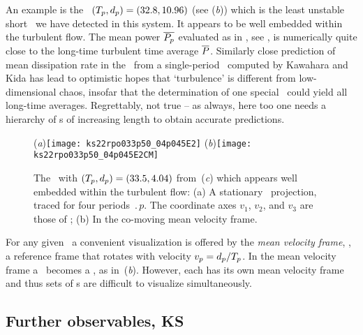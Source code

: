 An example is
the \rpo\ $({T_{p}},d_p) = (32.8,10.96)$
(see (\textit{b})) which {is the least
unstable short \rpo\ we have detected in this system. It} appears to be
well embedded within the turbulent flow. The mean power $\overline{P_p}$ evaluated
as in , see ,
is numerically quite close to the long-time
turbulent time average $\overline{P}$.
Similarly close prediction of mean dissipation rate in the
\pCf\ from a single-period \po\ computed by
Kawahara and Kida has lead to
optimistic hopes that `turbulence' is different from
low-dimensional chaos, insofar that the determination of one special
\po\ could yield all long-time averages.
Regrettably, not true -- as always, here too one needs a hierarchy
of \po s of increasing length to obtain accurate
predictions.

\begin{figure}[t]
\begin{center}
(\textit{a})\texttt{[image: ks22rpo033p50\_04p045E2]}
(\textit{b})\texttt{[image: ks22rpo033p50\_04p045E2CM]}
\\
\end{center}
\caption{
 The
\rpo\ with $({T_{p}},d_p) =(33.5,4.04)$
from \,(\textit{c})
which appears well embedded within the turbulent flow:
 (a) A stationary \statesp\ projection,
  traced for four periods $\period{p}$. The coordinate axes
$v_1$, $v_2$, and $v_3$ are those of ;
 (b) In the co-moving mean velocity frame.
        } \label{f:MeanVelocityFrame}
\end{figure}

For any given \rpo\ a convenient visualization is
offered by the {\em mean velocity frame}, {\ie},
a reference frame that rotates with velocity
$v_p=d_p/{T_{p}}$.
In the mean velocity frame a \rpo\ becomes
a \po, as in \,(\textit{b}).
However, each {\rpo} has its own mean velocity frame and thus
sets of \rpo s are difficult to visualize simultaneously.

\subsection{Further observables, KS}
\label{sec:energy}

